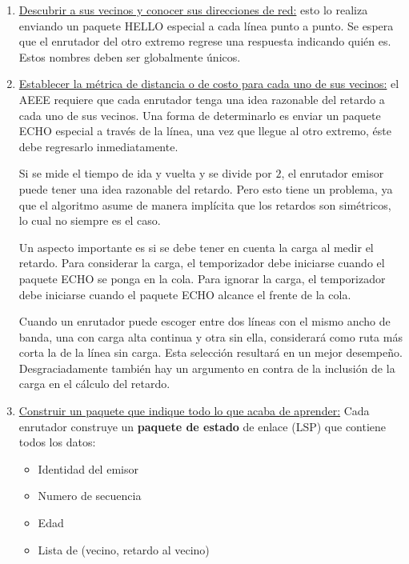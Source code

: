 	\begin{enumerate}
		\item \underline{Descubrir a sus vecinos y conocer sus direcciones de red:} esto lo realiza enviando un paquete HELLO especial a cada línea punto a punto. Se espera que el 	enrutador del otro extremo regrese una respuesta indicando quién es. Estos nombres deben ser globalmente únicos.

		\item \underline{Establecer la métrica de distancia o de costo para cada uno de sus vecinos:} el AEEE requiere que cada enrutador tenga una idea razonable del retardo a cada uno de sus vecinos. Una forma de determinarlo es enviar un paquete ECHO especial a través de la línea, una vez que llegue al otro extremo, éste debe regresarlo inmediatamente.

		\par Si se mide el tiempo de ida y vuelta y se divide por $2$, el enrutador emisor 
		puede tener una idea razonable del retardo. Pero esto tiene un problema, ya que 
		el algoritmo asume de manera implícita que los retardos son simétricos, lo cual no 
		siempre es el caso.

		\par Un aspecto importante es si se debe tener en cuenta la carga al medir el 
		retardo. Para considerar la carga, el temporizador debe iniciarse cuando el paquete 
		ECHO se ponga en la cola. Para ignorar la carga, el temporizador debe iniciarse 
		cuando el paquete ECHO alcance el frente de la cola.
		
		\par Cuando un enrutador puede escoger entre dos líneas con el mismo ancho de 
		banda, una con carga alta continua y otra sin ella, considerará como ruta más 
		corta la de la línea sin carga. Esta selección resultará en un mejor desempeño. 		
		Desgraciadamente también hay un argumento en contra de la inclusión de la carga 
		en el cálculo del retardo.

		\item \underline{Construir un paquete que indique todo lo que acaba de aprender:} Cada enrutador construye un \textbf{paquete de estado} de enlace (LSP) que contiene todos los datos:
		\begin{itemize}
			\item Identidad del emisor
			\item Numero de secuencia
			\item Edad
			\item Lista de (vecino, retardo al vecino)
		\end{itemize}
		

\end{enumerate}
